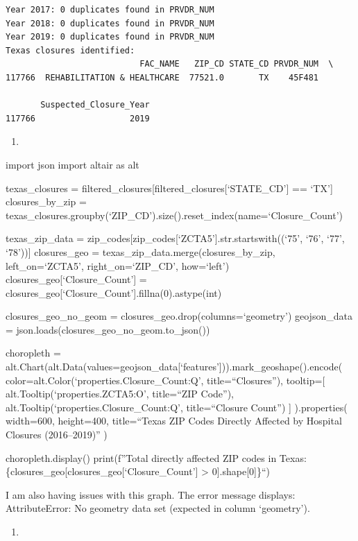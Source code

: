 \documentclass[
  letterpaper,
  DIV=11,
  numbers=noendperiod]{scrartcl}
\providecommand{\tightlist}{%
  \setlength{\itemsep}{0pt}\setlength{\parskip}{0pt}}\usepackage{longtable,booktabs,array}
\begin{document}
\begin{verbatim}
Year 2017: 0 duplicates found in PRVDR_NUM
Year 2018: 0 duplicates found in PRVDR_NUM
Year 2019: 0 duplicates found in PRVDR_NUM
Texas closures identified:
                           FAC_NAME   ZIP_CD STATE_CD PRVDR_NUM  \
117766  REHABILITATION & HEALTHCARE  77521.0       TX    45F481   

       Suspected_Closure_Year  
117766                   2019  
\end{verbatim}

\begin{enumerate}
\def\labelenumi{\arabic{enumi}.}
\setcounter{enumi}{1}
\tightlist
\item
\end{enumerate}

import json import altair as alt

texas\_closures =
filtered\_closures{[}filtered\_closures{[}`STATE\_CD'{]} == `TX'{]}
closures\_by\_zip =
texas\_closures.groupby(`ZIP\_CD').size().reset\_index(name=`Closure\_Count')

texas\_zip\_data =
zip\_codes{[}zip\_codes{[}`ZCTA5'{]}.str.startswith((`75', `76', `77',
`78')){]} closures\_geo = texas\_zip\_data.merge(closures\_by\_zip,
left\_on=`ZCTA5', right\_on=`ZIP\_CD', how=`left')
closures\_geo{[}`Closure\_Count'{]} =
closures\_geo{[}`Closure\_Count'{]}.fillna(0).astype(int)

closures\_geo\_no\_geom = closures\_geo.drop(columns=`geometry')
geojson\_data = json.loads(closures\_geo\_no\_geom.to\_json())

choropleth =
alt.Chart(alt.Data(values=geojson\_data{[}`features'{]})).mark\_geoshape().encode(
color=alt.Color(`properties.Closure\_Count:Q', title=``Closures''),
tooltip={[} alt.Tooltip(`properties.ZCTA5:O', title=``ZIP Code''),
alt.Tooltip(`properties.Closure\_Count:Q', title=``Closure Count'') {]}
).properties( width=600, height=400, title=``Texas ZIP Codes Directly
Affected by Hospital Closures (2016--2019)'' )

choropleth.display() print(f''Total directly affected ZIP codes in
Texas: \{closures\_geo{[}closures\_geo{[}`Closure\_Count'{]}
\textgreater{} 0{]}.shape{[}0{]}\}``)

I am also having issues with this graph. The error message displays:
AttributeError: No geometry data set (expected in column `geometry').

\begin{enumerate}
\def\labelenumi{\arabic{enumi}.}
\setcounter{enumi}{2}
\tightlist
\item
\end{enumerate}
\end{document}
